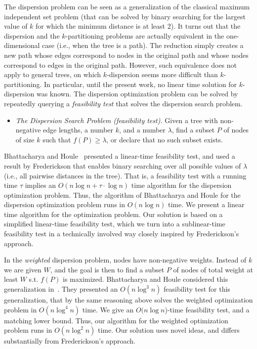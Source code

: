 \documentclass[11pt,a4paper]{article}
\theoremstyle{definition}
\theoremstyle{remark}
\begin{document}
\noindent The dispersion problem can be seen as a generalization of the classical maximum independent set problem (that can be solved by binary searching for the largest value of $k$ for which the minimum distance is at least 2).  
%
It turns out that the dispersion and the $k$-partitioning problems are actually equivalent in the one-dimensional case (i.e., when the tree is a path). The reduction simply creates a new path whose edges correspond to nodes in the original path and whose nodes correspond to edges in the original path. However, such equivalence does not apply to general trees, on which $k$-dispersion seems more difficult than $k$-partitioning. In particular, until the present work, no linear time solution for $k$-dispersion was known. 
The dispersion optimization problem can be solved by repeatedly querying a {\em feasibility test} that solves the dispersion search problem. 

\begin{itemize}
\item  {\em The Dispersion Search Problem (feasibility test).}  Given a tree with non-negative edge lengths, a number $k$, and a number $\lambda$, find a subset $P$ of nodes of size $k$ such that  $f(P)\geq\lambda$, or declare that no such subset exists. 
\end{itemize}

\noindent Bhattacharya and Houle~\cite{Bhattacharya1991} presented a linear-time feasibility test, and used a result by Frederickson \cite{Frederickson1983} that enables binary searching over all possible values of $\lambda$ (i.e., all pairwise distances in the tree). That is, a feasibility test with a running time $\tau$ implies an $O(n \log n + \tau \cdot \log n)$ time algorithm for the dispersion optimization problem. Thus, the algorithm of Bhattacharya and Houle for the dispersion optimization problem runs in $O(n\log n)$ time. We present a linear time algorithm for the optimization problem. Our solution is based on a simplified linear-time feasibility test, which we turn into a sublinear-time feasibility test in a technically involved way closely inspired by Frederickson's approach.

In the {\em weighted} dispersion problem, nodes have non-negative weights. Instead of $k$ we are given $W$, and the goal is then to find a subset
$P$ of nodes of total weight at least $W$ s.t. $f(P)$ is maximized. Bhattacharya and Houle considered this generalization in~\cite{Bhattacharya1999}. They presented an $O(n \log^3 n)$ feasibility test for this generalization, that by the same reasoning above solves the weighted optimization problem in $O(n \log^4 n)$ time. We give an $O(n \log n$)-time feasibility test, and a matching lower bound.  Thus, our algorithm for the weighted optimization problem runs in $O(n \log^2 n)$ time. Our solution uses novel ideas, and differs substantially from Frederickson's approach.
\end{document}
